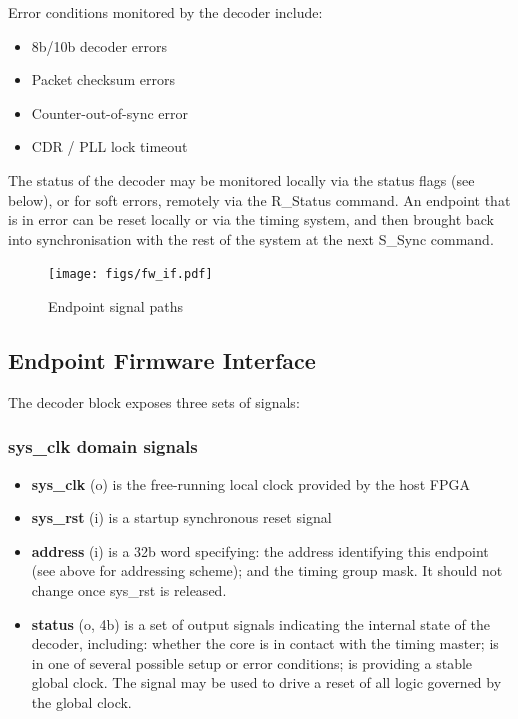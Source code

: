 \documentclass[a4paper,11pt]{article}
\begin{document}
Error conditions monitored by the decoder include:

\begin{itemize}
	\item 8b/10b decoder errors
	\item Packet checksum errors
	\item Counter-out-of-sync error
	\item CDR / PLL lock timeout
\end{itemize}

The status of the decoder may be monitored locally via the status flags (see below), or for soft errors, remotely via the R\_Status command. An endpoint that is in error can be reset locally or via the timing system, and then brought back into synchronisation with the rest of the system at the next S\_Sync command.

\begin{figure}[p]
	\centering
	\texttt{[image: figs/fw\_if.pdf]}
	\caption{Endpoint signal paths}
	\label{fig:fw_if}
\end{figure}

\subsection{Endpoint Firmware Interface}

The decoder block exposes three sets of signals:

\subsubsection{sys\_clk domain signals}

\begin{itemize}
	\item {\bf sys\_clk} (o) is the free-running local clock provided by the host FPGA
	\item {\bf sys\_rst} (i) is a startup synchronous reset signal
	\item {\bf address} (i) is a 32b word specifying: the address identifying this endpoint (see above for addressing scheme); and the timing group mask. It should not change once sys\_rst is released.
	\item {\bf status} (o, 4b) is a set of output signals indicating the internal state of the decoder, including: whether the core is in contact with the timing master; is in one of several possible setup or error conditions; is providing a stable global clock. The signal may be used to drive a reset of all logic governed by the global clock.
\end{itemize}
\end{document}
